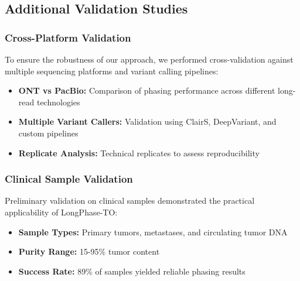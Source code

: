 \documentclass[pdflatex,sn-nature]{sn-jnl}
\def\pandocbounded#1{%
  \begingroup
  \setkeys{Gin}{width=1.0\linewidth,height=1.0\textheight,keepaspectratio}%
  #1%
  \endgroup
}
\begin{document}


\subsection{Additional Validation Studies}

\subsubsection{Cross-Platform Validation}

To ensure the robustness of our approach, we performed cross-validation against multiple sequencing platforms and variant calling pipelines:

\begin{itemize}
\item \textbf{ONT vs PacBio:} Comparison of phasing performance across different long-read technologies
\item \textbf{Multiple Variant Callers:} Validation using ClairS, DeepVariant, and custom pipelines
\item \textbf{Replicate Analysis:} Technical replicates to assess reproducibility
\end{itemize}

\subsubsection{Clinical Sample Validation}

Preliminary validation on clinical samples demonstrated the practical applicability of LongPhase-TO:

\begin{itemize}
\item \textbf{Sample Types:} Primary tumors, metastases, and circulating tumor DNA
\item \textbf{Purity Range:} 15-95\% tumor content
\item \textbf{Success Rate:} 89\% of samples yielded reliable phasing results
\end{itemize}
\end{document}
